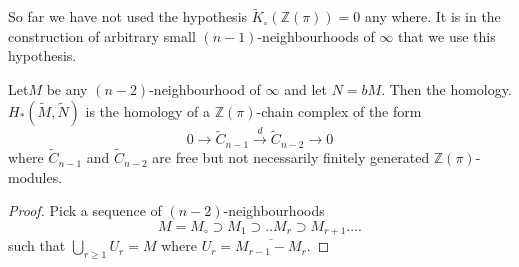 So far we have not used the hypothesis $\tilde{K}_\circ (\mathbb{Z} (\pi)) 
= 0$ any where. It is in the construction of arbitrary small
$(n-1)$-neighbourhoods of $\infty$ that we use this hypothesis. 

\begin{lemma}\label{chap2:lem4.1}%
 Let\pageoriginale $M$ be any $(n-2)$-neighbourhood of $\infty$ and
 let $N=   bM$. Then the homology. $H_*(\tilde{M}, \tilde{N})$ is the
 homology of a $\mathbb{Z}(\pi)$-chain complex of the form  
$$
0 \to \tilde{C}_{n-1} \xrightarrow{d} \tilde{C}_{n-2}\to 0 
$$
where $\tilde{C}_{n-1}$ and $\tilde{C}_{n-2}$ are free but not
necessarily finitely generated $\mathbb{Z}(\pi)$-modules. 
\end{lemma}

\begin{proof}
Pick a sequence of $(n-2)$-neighbourhoods
$$
M=M_\circ \supset M_1 \supset .. M_r \supset M_{r+1}\ldots.
$$
such that $\bigcup\limits_{r \geq 1} U_r = M$ where $U_r=
\overline{M_{r-1}-M_r}$. 
\end{proof}

